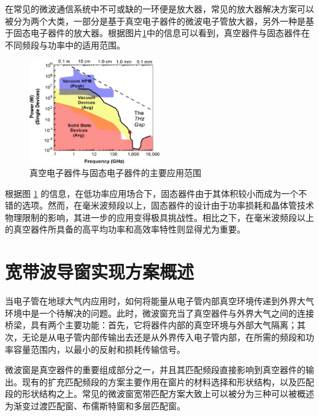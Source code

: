 \documentclass[master]{thesis-uestc}
\begin{document}
在常见的微波通信系统中不可或缺的一环便是放大器，常见的放大器解决方案可以被分为两个大类，一部分是基于真空电子器件的微波电子管放大器，另外一种是基于固态电子器件的放大器。根据图片\ref{fig:真空电子器件与固态电子器件的主要应用范围}中的信息可以看到，真空器件与固态器件在不同频段与功率中的适用范围。
\begin{figure}[!htb]
    \centering
    \includegraphics[width=0.5\textwidth]{pic/chapter1/器件平均功率-频率示意图.png}
    \caption{真空电子器件与固态电子器件的主要应用范围}
    \label{fig:真空电子器件与固态电子器件的主要应用范围}
\end{figure}

根据图 \ref{fig:真空电子器件与固态电子器件的主要应用范围} 的信息，在低功率应用场合下，固态器件由于其体积较小而成为一个不错的选项。然而，在毫米波频段以上，固态器件的设计由于功率损耗和晶体管技术物理限制的影响，其进一步的应用变得极具挑战性。相比之下，在毫米波频段以上的真空器件所具备的高平均功率和高效率特性则显得尤为重要。


\section{宽带波导窗实现方案概述}
当电子管在地球大气内应用时，如何将能量从电子管内部真空环境传递到外界大气环境中是一个待解决的问题。此时，微波窗充当了真空器件与外界大气之间的连接桥梁，具有两个主要功能：首先，它将器件内部的真空环境与外部大气隔离；其次，无论是从电子管内部传输出去还是从外界传入电子管内部，在所需的频段和功率容量范围内，以最小的反射和损耗传输信号。

微波窗是真空器件的重要组成部分之一，并且其匹配频段直接影响到真空器件的输出。现有的扩充匹配频段的方案主要作用在窗片的材料选择和形状结构，以及匹配段的形状结构之上。常见的微波窗宽带匹配方案大致上可以被分为三种可以被概述为渐变过渡匹配窗、布儒斯特窗和多层匹配窗。
\end{document}
